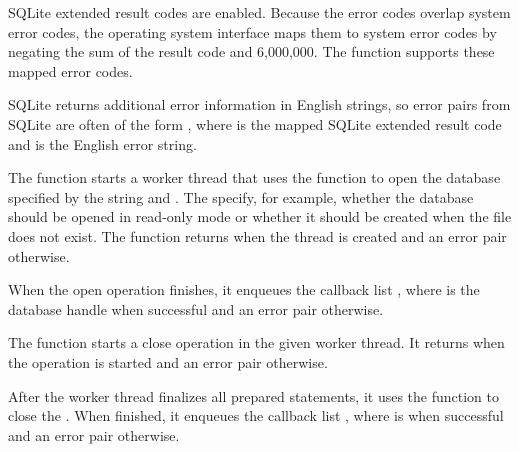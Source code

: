 SQLite extended result codes are enabled. Because the error codes
overlap system error codes, the operating system interface maps them
to system error codes by negating the sum of the result code and
6,000,000. The  function supports these
mapped error codes.

SQLite returns additional error information in English strings, so
error pairs from SQLite are often of the form , where  is the mapped
SQLite extended result code and  is the English error
string.

\begin{function}
\end{function}

The  function starts a worker thread that
uses the  function to open the database
specified by the  string and . The
 specify, for example, whether the database should be
opened in read-only mode or whether it should be created when the file
does not exist. The function returns  when the thread is
created and an error pair otherwise.

When the open operation finishes, it enqueues the callback list
, where  is the
database handle when successful and an error pair otherwise.

\begin{function}
\end{function}

The  function starts a close operation in
the given  worker thread. It returns  when the
operation is started and an error pair otherwise.

After the worker thread finalizes all prepared statements, it uses the
 function to close the . When
finished, it enqueues the callback list , where  is  when successful and
an error pair otherwise.

\begin{function}
\end{function}

